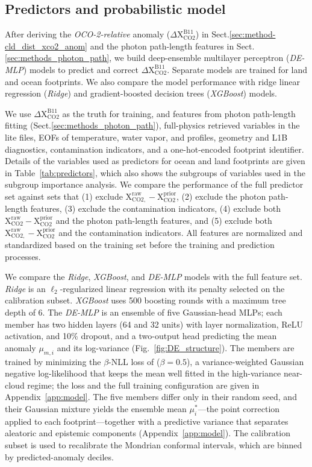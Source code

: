 \subsection{Predictors and probabilistic model}
\label{sec:methods-models}


After deriving the \emph{OCO-2-relative} anomaly ($\Delta \mathrm{X_{CO2}^{B11}}$) in Sect.\ref{sec:method-cld_dist_xco2_anom} and the photon path-length features in Sect.\ref{sec:methods_photon_path}, we build deep-ensemble multilayer perceptron (\emph{DE-MLP}) models to predict and correct $\Delta \mathrm{X_{CO2}^{B11}}$. Separate models are trained for land and ocean footprints. We also compare the model performance with ridge linear regression (\emph{Ridge}) and gradient-boosted decision trees (\emph{XGBoost}) models.

We use $\Delta \mathrm{X_{CO2}^{B11}}$ as the truth for training, and features from photon path-length fitting (Sect.\ref{sec:methods_photon_path}), full-physics retrieved variables in the lite files, EOFs of temperature, water vapor, and  profiles, geometry and L1B diagnostics, contamination indicators, and a one-hot-encoded footprint identifier. Details of the variables used as predictors for ocean and land footprints are given in Table~\ref{tab:predictors}, which also shows the subgroups of variables used in the subgroup importance analysis. We compare the performance of the full predictor set against sets that (1) exclude $\mathrm{X_{CO2,}^{raw}}-\mathrm{X_{CO2}^{prior}}$, (2) exclude the photon path-length features, (3) exclude the contamination indicators, (4) exclude both $\mathrm{X_{CO2}^{raw}}-\mathrm{X_{CO2}^{prior}}$ and the photon path-length features, and (5) exclude both $\mathrm{X_{CO2,}^{raw}}-\mathrm{X_{CO2}^{prior}}$ and the contamination indicators. All features are normalized and standardized based on the training set before the training and prediction processes.

We compare the \emph{Ridge}, \emph{XGBoost}, and \emph{DE-MLP} models with the
full feature set. \emph{Ridge} is an $\ell_2$-regularized linear regression with
its penalty selected on the calibration subset. \emph{XGBoost} uses 500 boosting
rounds with a maximum tree depth of 6. The \emph{DE-MLP} is an ensemble of five
Gaussian-head MLPs; each member has two hidden layers (64 and 32 units) with
layer normalization, ReLU activation, and 10\% dropout, and a two-output head
predicting the mean anomaly $\mu_{m,i}$ and its log-variance
(Fig.~\ref{fig:DE_structure}). The members are trained by minimizing the
$\beta$-NLL loss of \citet{seitzer2022pitfalls} ($\beta = 0.5$), a
variance-weighted Gaussian negative log-likelihood that keeps the mean well
fitted in the high-variance near-cloud regime; the loss and the full training
configuration are given in Appendix~\ref{app:model}. The five members differ
only in their random seed, and their Gaussian mixture yields the ensemble mean
$\mu^{*}_i$—the point correction applied to each footprint—together with a
predictive variance that separates aleatoric and epistemic components
(Appendix~\ref{app:model}). The calibration subset is used to recalibrate the
Mondrian conformal intervals, which are binned by predicted-anomaly deciles.

